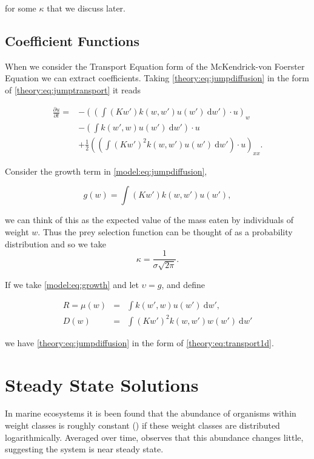 \documentclass[../main]{subfiles}
\begin{document}
  for some $\kappa$ that we discuss later.

  \subsection{Coefficient Functions}
  When we consider the Transport Equation form of the McKendrick-von Foerster Equation we can extract coefficients. Taking \autoref{theory:eq:jumpdiffusion} in the form of \autoref{theory:eq:jumptransport} it reads

  \begin{align}\label{model:eq:jumpdiffusion}
    \frac{\partial u}{\partial t} =
    & - \left( \left( \int (K w') k(w, w') u(w') \: \mathrm{d}w' \right) \cdot u \right)_w \nonumber \\
    & -  \left( \int k(w', w) u(w') \: \mathrm{d}w' \right) \cdot u \nonumber \\
    & + \frac{1}{2} \left( \left( \int (K w')^2 k(w, w') u(w') \: \mathrm{d}w' \right) \cdot u\right)_{xx}.
  \end{align}

  Consider the growth term in \autoref{model:eq:jumpdiffusion},

  \begin{equation}\label{model:eq:growth}
    g(w) = \int (K w') k(w, w') u(w'),
  \end{equation}

  we can think of this as the expected value of the mass eaten by individuals of weight $w$. Thus the prey selection function can be thought of as a probability distribution and so we take $$\kappa = \frac{1}{\sigma\sqrt{2 \pi}}.$$

  If we take \autoref{model:eq:growth} and let $\upsilon = g$, and define

  \begin{eqnarray}
    R = \mu(w)  &=& \int k(w', w) u(w') \: \mathrm{d}w', \\
    D(w)    &=& \int (K w')^2 k(w, w') w(w') \: \mathrm{d}w'
  \end{eqnarray}

  we have \autoref{theory:eq:jumpdiffusion} in the form of \autoref{theory:eq:transport1d}.

  \section{Steady State Solutions}
  In marine ecosystems it is been found that the abundance of organisms within weight classes is roughly constant (\cite{sheldon1972}) if these weight classes are distributed logarithmically. Averaged over time, \cite{datta2011} observes that this abundance changes little, suggesting the system is near steady state.
\end{document}
